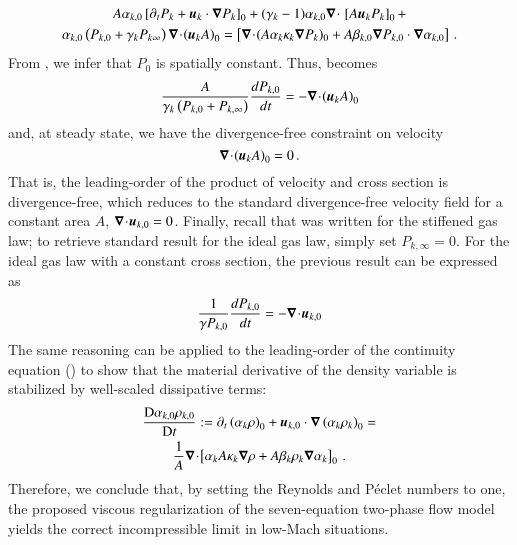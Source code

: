 \documentclass[preprint,10pt]{elsarticle}
\begin{document}
%
\begin{multline}\label{eq:asympt_equ3_ener}
A \alpha_{k,0} \left[ \partial_t  P_k  + \boldsymbol u_k \cdot \boldsymbol\nabla  P_k \right]_0 + 
(\gamma_k-1) \alpha_{k,0} \boldsymbol\nabla\! \cdot \! \ \left[ A \boldsymbol u_k P_k \right]_0 +\\ 
\alpha_{k,0}  \left( P_{k,0} +  \gamma_k P_{k\infty} \right) \boldsymbol\nabla\! \cdot \!  \left( \boldsymbol u_k A\right )_0 = 
\left[ \boldsymbol\nabla\! \cdot \! (A \alpha_k \kappa_k \boldsymbol\nabla P_k)_0 + A \beta_{k,0} \boldsymbol\nabla P_{k,0} \cdot \boldsymbol\nabla \alpha_{k,0} \right]  \,.
\end{multline}
%
From , we infer that $P_0$ is spatially constant. Thus,  becomes
%
\begin{equation}\label{eq:div_free_energy}
\frac{ A}{\gamma_k\left( P_{k,0} + P_{k,\infty} \right)} \frac{d P_{k,0}}{dt} = - \boldsymbol\nabla\! \cdot \! \left( \boldsymbol u_k A \right)_0 
\end{equation}
%
and, at steady state, we have the divergence-free constraint on velocity
%
\begin{equation}
\boldsymbol\nabla\! \cdot \! \left( \boldsymbol u_k A \right)_0  = 0 \, .
\end{equation}
%
That is, the leading-order of the product of velocity and cross section is divergence-free, which reduces to the standard divergence-free velocity field for a constant area $A$, $\boldsymbol\nabla\! \cdot \! \boldsymbol u_{k,0}=0$. Finally, recall that  was written for the stiffened gas law; to retrieve standard result for the ideal gas law, simply set $P_{k,\infty}=0$. For the ideal gas law with a constant cross section, the previous result can be expressed as
%
\begin{equation}
\frac{1}{\gamma P_{k,0}} \frac{d P_{k,0}}{dt} = - \boldsymbol\nabla\! \cdot \!\boldsymbol u_{k,0} 
\end{equation}
%
The same reasoning can be applied to the leading-order 
of the continuity equation () to show that the material derivative of the density variable is stabilized by well-scaled dissipative terms:
\begin{multline}
\frac{\textrm{D} \alpha_{k,0} \rho_{k,0}}{\textrm{D} t} := \partial_t \left( \alpha_k \rho\right)_0 + \boldsymbol u_{k,0} \cdot \boldsymbol\nabla \left( \alpha_k \rho_k \right)_0 =\\
\frac{1}{A}  \boldsymbol\nabla\! \cdot \! \left[ \alpha_k A \kappa_k \boldsymbol\nabla \rho + A \beta_k \rho_k \boldsymbol\nabla \alpha_k \right]_0 \, .
\end{multline}
%
Therefore, we conclude that, by setting the Reynolds and P\'eclet numbers to one, the proposed viscous regularization
of the seven-equation two-phase flow model yields the correct incompressible limit in low-Mach situations.
\end{document}
